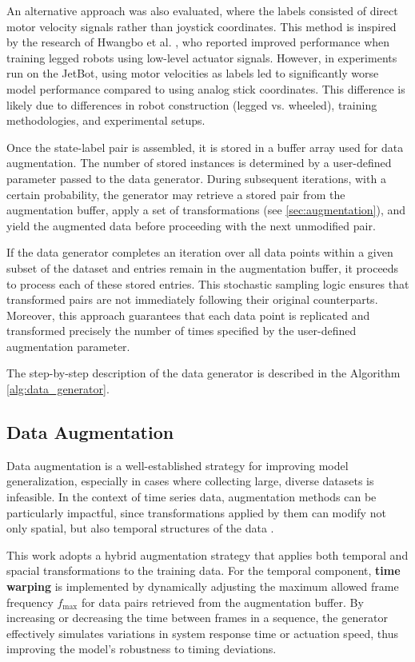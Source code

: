 An alternative approach was also evaluated, where the labels consisted of direct motor velocity signals rather than joystick coordinates. This method is inspired by the research of Hwangbo et al. \autocite{hwangbo2019learning}, who reported improved performance when training legged robots using low-level actuator signals. However, in experiments run on the JetBot, using motor velocities as labels led to significantly worse model performance compared to using analog stick coordinates. This difference is likely due to differences in robot construction (legged vs. wheeled), training methodologies, and experimental setups.

Once the state-label pair is assembled, it is stored in a buffer array used for data augmentation. The number of stored instances is determined by a user-defined parameter passed to the data generator. During subsequent iterations, with a certain probability, the generator may retrieve a stored pair from the augmentation buffer, apply a set of transformations (see \autoref{sec:augmentation}), and yield the augmented data before proceeding with the next unmodified pair.

If the data generator completes an iteration over all data points within a given subset of the dataset and entries remain in the augmentation buffer, it proceeds to process each of these stored entries. This stochastic sampling logic ensures that transformed pairs are not immediately following their original counterparts. Moreover, this approach guarantees that each data point is replicated and transformed precisely the number of times specified by the user-defined augmentation parameter.

The step-by-step description of the data generator is described in the Algorithm \ref{alg:data_generator}.

\subsection{Data Augmentation}
\label{sec:augmentation}

Data augmentation is a well-established strategy for improving model generalization, especially in cases where collecting large, diverse datasets is infeasible. In the context of time series data, augmentation methods can be particularly impactful, since transformations applied by them can modify not only spatial, but also temporal structures of the data \autocite{iglesias2023data}.

This work adopts a hybrid augmentation strategy that applies both temporal and spacial transformations to the training data. For the temporal component, \textbf{time warping} is implemented by dynamically adjusting the maximum allowed frame frequency \( f_{\text{max}} \) for data pairs retrieved from the augmentation buffer. By increasing or decreasing the time between frames in a sequence, the generator effectively simulates variations in system response time or actuation speed, thus improving the model's robustness to timing deviations.

